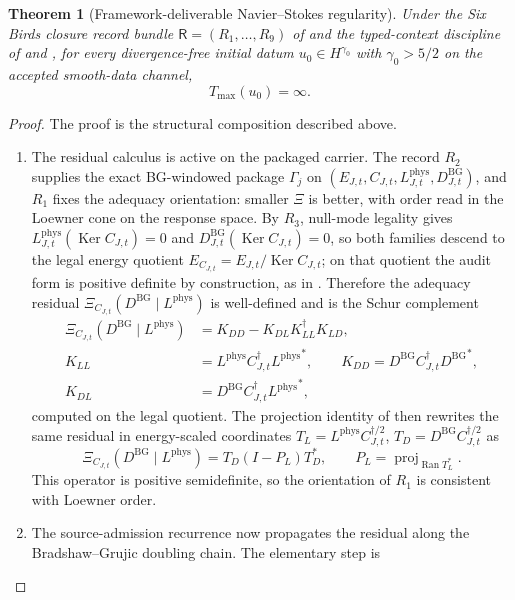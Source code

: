\documentclass[11pt]{article}
\DeclareMathOperator{\Ran}{Ran}
\DeclareMathOperator{\Ker}{Ker}
\newcommand{\DBG}{D^{\mathrm{BG}}}
\newcommand{\Lphys}{L^{\mathrm{phys}}}
\newcommand{\Tmax}{T_{\max}}
\newtheorem{theorem}{Theorem}[section]
\theoremstyle{definition}
\begin{document}
\begin{theorem}[Framework-deliverable Navier--Stokes regularity]
\label{thm:ns:framework-deliverable-regularity}
Under the Six Birds closure record bundle
\(\mathsf R=(R_1,\ldots,R_9)\) of
 and the typed-context discipline of
\citet{Tsiokos2026NeedleKiller} and
\citet{Tsiokos2026XiCompanion}, for every divergence-free initial datum
\(u_0\in H^{\gamma_0}\) with \(\gamma_0>5/2\) on the accepted
smooth-data channel,
\[
  \boxed{\Tmax(u_0)=\infty .}
\]
\end{theorem}

\begin{proof}
The proof is the structural composition described above.
\begin{enumerate}[label=\emph{Step \arabic*.}]
\item The residual calculus is active on the packaged carrier.  The
record \(R_2\) supplies the exact BG-windowed package \(\Gamma_j\) on
\((E_{J,t},C_{J,t},\Lphys_{J,t},\DBG_{J,t})\), and \(R_1\) fixes the
adequacy orientation: smaller \(\Xi\) is better, with order read in
the Loewner cone on the response space.  By \(R_3\), null-mode
legality gives
\(\Lphys_{J,t}(\Ker C_{J,t})=0\) and
\(\DBG_{J,t}(\Ker C_{J,t})=0\), so both families descend to the legal
energy quotient \(E_{C_{J,t}}=E_{J,t}/\Ker C_{J,t}\); on that quotient
the audit form is positive definite by construction, as in
.  Therefore the adequacy
residual \(\Xi_{C_{J,t}}(\DBG\mid\Lphys)\) is well-defined and is the
Schur complement
\[
  \begin{aligned}
  \Xi_{C_{J,t}}(\DBG\mid\Lphys)
  &= K_{DD}-K_{DL}K_{LL}^{\dagger}K_{LD},\\
  K_{LL} &= \Lphys C_{J,t}^{\dagger}{\Lphys}^*,\qquad
  K_{DD} = \DBG C_{J,t}^{\dagger}{\DBG}^*,\\
  K_{DL} &= \DBG C_{J,t}^{\dagger}{\Lphys}^* ,
  \end{aligned}
\]
computed on the legal quotient.  The projection identity of
\citet{Tsiokos2026XiCompanion} then rewrites the same residual in
energy-scaled coordinates
\(T_L=\Lphys C_{J,t}^{\dagger/2}\),
\(T_D=\DBG C_{J,t}^{\dagger/2}\) as
\[
  \Xi_{C_{J,t}}(\DBG\mid\Lphys)=T_D(I-P_L)T_D^*,
  \qquad P_L=\operatorname{proj}_{\Ran T_L^*}.
\]
This operator is positive semidefinite, so the orientation of \(R_1\)
is consistent with Loewner order.
\item The source-admission recurrence now propagates the residual along
the Bradshaw--Grujic doubling chain.  The elementary step is

\end{enumerate}
\end{proof}
\end{document}
